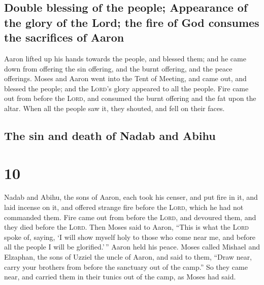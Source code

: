 \hypertarget{double-blessing-of-the-people-appearance-of-the-glory-of-the-lord-the-fire-of-god-consumes-the-sacrifices-of-aaron}{%
\subsection{Double blessing of the people; Appearance of the glory of
the Lord; the fire of God consumes the sacrifices of
Aaron}\label{double-blessing-of-the-people-appearance-of-the-glory-of-the-lord-the-fire-of-god-consumes-the-sacrifices-of-aaron}}

 Aaron lifted up his hands towards the people, and
blessed them; and he came down from offering the sin offering, and the
burnt offering, and the peace offerings.  Moses and Aaron
went into the Tent of Meeting, and came out, and blessed the people; and
the \textsc{Lord}'s glory appeared to all the people. 
Fire came out from before the \textsc{Lord}, and consumed the burnt
offering and the fat upon the altar. When all the people saw it, they
shouted, and fell on their faces.

\hypertarget{the-sin-and-death-of-nadab-and-abihu}{%
\subsection{The sin and death of Nadab and
Abihu}\label{the-sin-and-death-of-nadab-and-abihu}}

\hypertarget{section-9}{%
\section{10}\label{section-9}}

 Nadab and Abihu, the sons of Aaron, each took his censer,
and put fire in it, and laid incense on it, and offered strange fire
before the \textsc{Lord}, which he had not commanded them.
 Fire came out from before the \textsc{Lord}, and devoured
them, and they died before the \textsc{Lord}.  Then Moses
said to Aaron, ``This is what the \textsc{Lord} spoke of, saying, `I
will show myself holy to those who come near me, and before all the
people I will be glorified.'\,'' Aaron held his peace. 
Moses called Mishael and Elzaphan, the sons of Uzziel the uncle of
Aaron, and said to them, ``Draw near, carry your brothers from before
the sanctuary out of the camp.''  So they came near, and
carried them in their tunics out of the camp, as Moses had said.

